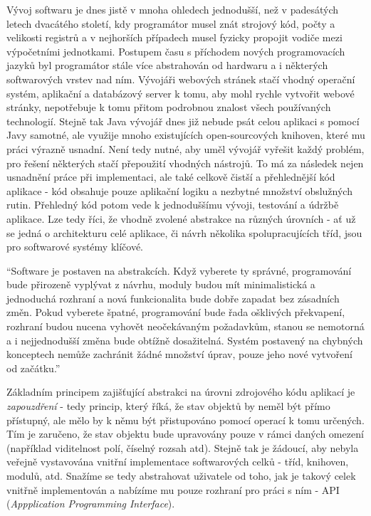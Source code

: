 Vývoj softwaru je dnes jistě v mnoha ohledech jednodušší, než v padesátých letech dvacátého století, kdy programátor musel znát strojový kód, počty a velikosti registrů a v nejhorších případech musel fyzicky propojit vodiče mezi výpočetními jednotkami. Postupem času s příchodem nových programovacích jazyků byl programátor stále více abstrahován od hardwaru a i některých softwarových vrstev nad ním. Vývojáři webových stránek stačí vhodný operační systém, aplikační a databázový server k tomu, aby mohl rychle vytvořit webové stránky, nepotřebuje k tomu přitom podrobnou znalost všech používaných technologií. Stejně tak Java vývojář dnes již nebude psát celou aplikaci s pomocí Javy samotné, ale využije mnoho existujících open-sourcových knihoven, které mu práci výrazně usnadní. Není tedy nutné, aby uměl vývojář vyřešit každý problém, pro řešení některých stačí přepoužití vhodných nástrojů. To má za následek nejen usnadnění práce při implementaci, ale také celkově čistší a přehlednější kód aplikace - kód obsahuje pouze aplikační logiku a nezbytné množství obslužných rutin. Přehledný kód potom vede k jednoduššímu vývoji, testování a údržbě aplikace. Lze tedy říci, že vhodně zvolené abstrakce na různých úrovních - ať už se jedná o architekturu celé aplikace, či návrh několika spolupracujících tříd, jsou pro softwarové systémy klíčové. 

 ``Software je postaven na abstrakcích. Když vyberete ty správné, programování bude přirozeně vyplývat z návrhu, moduly budou mít minimalistická a jednoduchá rozhraní a nová funkcionalita bude dobře zapadat bez zásadních změn. Pokud vyberete špatné, programování bude řada ošklivých překvapení, rozhraní budou nucena vyhovět neočekávaným požadavkům, stanou se nemotorná a i nejjednodušší změna bude obtížně dosažitelná. Systém postavený na chybných konceptech nemůže zachránit žádné množství úprav, pouze jeho nové vytvoření od začátku.'' \cite{Jackson06}  

Základním principem zajišťující abstrakci na úrovni zdrojového kódu aplikací je \textit{zapouzdření} - tedy princip, který říká, že stav objektů by neměl být přímo přístupný, ale mělo by k němu být přistupováno pomocí operací k tomu určených. Tím je zaručeno, že stav objektu bude upravovány pouze v rámci daných omezení (například viditelnost polí, číselný rozsah atd). Stejně tak je žádoucí, aby nebyla veřejně vystavována vnitřní implementace softwarových celků - tříd, knihoven, modulů, atd. Snažíme se tedy abstrahovat uživatele od toho, jak je takový celek vnitřně implementován a nabízíme mu pouze rozhraní pro práci s ním - API (\textit{Appplication Programming Interface}). 

